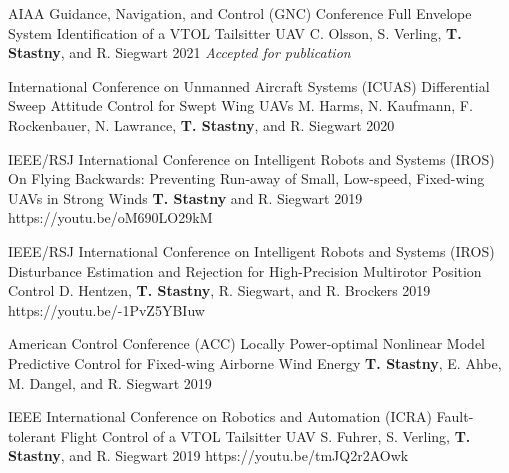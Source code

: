 \begin{cventries}
\clearpage
\begin{flushleft}
\end{flushleft}

\begin{cvnumlist}
%
\item \cvpubentry
	{AIAA Guidance, Navigation, and Control (GNC) Conference} %
	{Full Envelope System Identification of a VTOL Tailsitter UAV} %
	{C. Olsson, S. Verling, \textbf{T. Stastny}, and R. Siegwart} %
	{} %
	{2021} %
	{} %
	{\textit{Accepted for publication}} %

\item \cvpubentry
	{International Conference on Unmanned Aircraft Systems (ICUAS)} %
	{Differential Sweep Attitude Control for Swept Wing UAVs} %
	{M. Harms, N. Kaufmann, F. Rockenbauer, N. Lawrance, \textbf{T. Stastny}, and R. Siegwart} %
	{} %
	{2020} %
	{} %
	{} %
	
\item \cvpubentry
	{IEEE/RSJ International Conference on Intelligent Robots and Systems (IROS)} %
	{On Flying Backwards: Preventing Run-away of Small, Low-speed, Fixed-wing UAVs in Strong Winds} %
	{\textbf{T. Stastny} and R. Siegwart} %
	{} %
	{2019} %
	{https://youtu.be/oM690LO29kM} %
	{} %

\item \cvpubentry
	{IEEE/RSJ International Conference on Intelligent Robots and Systems (IROS)} %
	{Disturbance Estimation and Rejection for High-Precision Multirotor Position Control} %
	{D. Hentzen, \textbf{T. Stastny}, R. Siegwart, and R. Brockers} %
	{} %
	{2019} %
	{https://youtu.be/-1PvZ5YBIuw} %
	{} %

\item \cvpubentry
	{American Control Conference (ACC)} %
	{Locally Power-optimal Nonlinear Model Predictive Control for Fixed-wing Airborne Wind Energy} %
	{\textbf{T. Stastny}, E. Ahbe, M. Dangel, and R. Siegwart} %
	{} %
	{2019} %
	{} %
	{} %

\item \cvpubentry
	{IEEE International Conference on Robotics and Automation (ICRA)} %
	{Fault-tolerant Flight Control of a VTOL Tailsitter UAV} %
	{S. Fuhrer, S. Verling, \textbf{T. Stastny}, and R. Siegwart} %
	{} %
	{2019} %
	{https://youtu.be/tmJQ2r2AOwk} %
	{} %


\end{cvnumlist}
\end{cventries}
